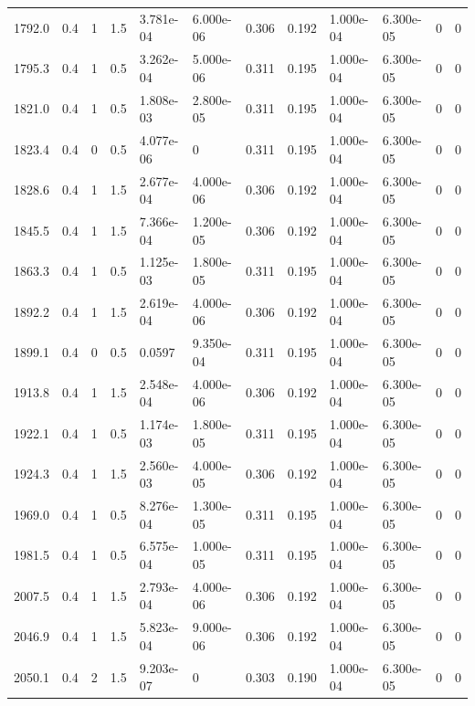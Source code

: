 \documentclass[preview]{standalone}
\begin{document}
{{{\begin{tabular}{L{1.2cm}C{1.2cm} C{0.3cm}C{0.5cm} C{1.4cm}C{1.4cm} C{1.4cm}C{1.4cm} C{1.6cm}C{1.6cm} C{1.6cm}C{1.6cm}}
  1792.0  &   0.4  & 1     & 1.5 &  3.781e-04  & 6.000e-06  &  0.306&   0.192& 1.000e-04 & 6.300e-05   &  0 & 0  \\ 
  1795.3  &   0.4  & 1     & 0.5 &  3.262e-04  & 5.000e-06  &  0.311&   0.195& 1.000e-04 & 6.300e-05   &  0 & 0  \\ 
  1821.0  &   0.4  & 1     & 0.5 &  1.808e-03  & 2.800e-05  &  0.311&   0.195& 1.000e-04 & 6.300e-05   &  0 & 0  \\ 
  1823.4  &   0.4  & 0     & 0.5 &  4.077e-06  & 0  &  0.311&   0.195& 1.000e-04 & 6.300e-05   &  0 & 0  \\ 
  1828.6  &   0.4  & 1     & 1.5 &  2.677e-04  & 4.000e-06  &  0.306&   0.192& 1.000e-04 & 6.300e-05   &  0 & 0  \\ 
  1845.5  &   0.4  & 1     & 1.5 &  7.366e-04  & 1.200e-05  &  0.306&   0.192& 1.000e-04 & 6.300e-05   &  0 & 0  \\ 
  1863.3  &   0.4  & 1     & 0.5 &  1.125e-03  & 1.800e-05  &  0.311&   0.195& 1.000e-04 & 6.300e-05   &  0 & 0  \\ 
  1892.2  &   0.4  & 1     & 1.5 &  2.619e-04  & 4.000e-06  &  0.306&   0.192& 1.000e-04 & 6.300e-05   &  0 & 0  \\ 
  1899.1  &   0.4  & 0     & 0.5 &  0.0597  & 9.350e-04  &  0.311&   0.195& 1.000e-04 & 6.300e-05   &  0 & 0  \\ 
  1913.8  &   0.4  & 1     & 1.5 &  2.548e-04  & 4.000e-06  &  0.306&   0.192& 1.000e-04 & 6.300e-05   &  0 & 0  \\ 
  1922.1  &   0.4  & 1     & 0.5 &  1.174e-03  & 1.800e-05  &  0.311&   0.195& 1.000e-04 & 6.300e-05   &  0 & 0  \\ 
  1924.3  &   0.4  & 1     & 1.5 &  2.560e-03  & 4.000e-05  &  0.306&   0.192& 1.000e-04 & 6.300e-05   &  0 & 0  \\ 
  1969.0  &   0.4  & 1     & 0.5 &  8.276e-04  & 1.300e-05  &  0.311&   0.195& 1.000e-04 & 6.300e-05   &  0 & 0  \\ 
  1981.5  &   0.4  & 1     & 0.5 &  6.575e-04  & 1.000e-05  &  0.311&   0.195& 1.000e-04 & 6.300e-05   &  0 & 0  \\ 
  2007.5  &   0.4  & 1     & 1.5 &  2.793e-04  & 4.000e-06  &  0.306&   0.192& 1.000e-04 & 6.300e-05   &  0 & 0  \\ 
  2046.9  &   0.4  & 1     & 1.5 &  5.823e-04  & 9.000e-06  &  0.306&   0.192& 1.000e-04 & 6.300e-05   &  0 & 0  \\ 
  2050.1  &   0.4  & 2     & 1.5 &  9.203e-07  & 0  &  0.303&   0.190& 1.000e-04 & 6.300e-05   &  0 & 0  \\ 

\end{tabular}}}}
\end{document}
